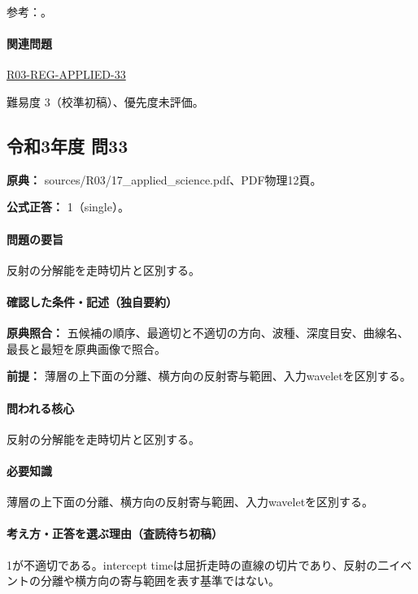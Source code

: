\par 参考：\cite{jica_refraction2015,usgs_refraction2013,epa_surfacewaves,xia_rayleigh1999,coastal_reflection2016,seg_vertical_resolution,usgs_processing2000}。

\paragraph{関連問題} \hyperref[q:r03-reg-applied-33]{R03-REG-APPLIED-33}

\par 難易度 3（校準初稿）、優先度未評価。

\subsection{令和3年度 問33}
\label{q:r03-reg-applied-33}

\noindent\textbf{原典：} sources/R03/17\_applied\_science.pdf、PDF物理12頁。

\textbf{公式正答：} 1（single）。

\paragraph{問題の要旨} 反射の分解能を走時切片と区別する。

\paragraph{確認した条件・記述（独自要約）}\mbox{}\par

\noindent\textbf{原典照合：} 五候補の順序、最適切と不適切の方向、波種、深度目安、曲線名、最長と最短を原典画像で照合。\par

\noindent\textbf{前提：} 薄層の上下面の分離、横方向の反射寄与範囲、入力waveletを区別する。\par

\paragraph{問われる核心} 反射の分解能を走時切片と区別する。

\paragraph{必要知識} 薄層の上下面の分離、横方向の反射寄与範囲、入力waveletを区別する。

\paragraph{考え方・正答を選ぶ理由（査読待ち初稿）} 1が不適切である。intercept timeは屈折走時の直線の切片であり、反射の二イベントの分離や横方向の寄与範囲を表す基準ではない。


